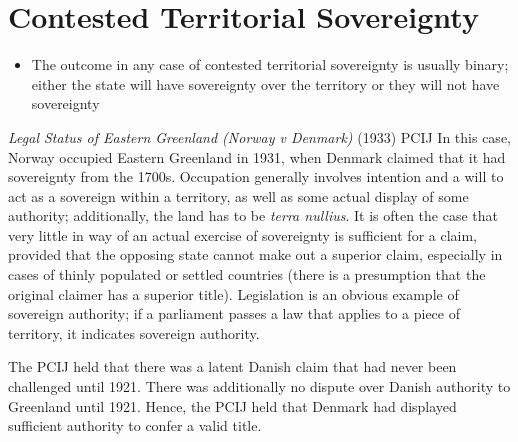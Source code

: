 \section{Contested Territorial Sovereignty}
\begin{itemize}
    \item The outcome in any case of contested territorial sovereignty is usually binary; either the state will have sovereignty over the territory or they will not have sovereignty
\end{itemize}
\begin{casedetails}{\textit{Legal Status of Eastern Greenland (Norway v Denmark)} (1933) PCIJ}
    \flushleft
    In this case, Norway occupied Eastern Greenland in 1931, when Denmark claimed that it had sovereignty from the 1700s. Occupation generally involves intention and a will to act as a sovereign within a territory, as well as some actual display of some authority; additionally, the land has to be \textit{terra nullius}. It is often the case that very little in way of an actual exercise of sovereignty is sufficient for a claim, provided that the opposing state cannot make out a superior claim, especially in cases of thinly populated or settled countries (there is a presumption that the original claimer has a superior title). Legislation is an obvious example of sovereign authority; if a parliament passes a law that applies to a piece of territory, it indicates sovereign authority.

    \vspace{\baselineskip}

    The PCIJ held that there was a latent Danish claim that had never been challenged until 1921. There was additionally no dispute over Danish authority to Greenland until 1921. Hence, the PCIJ held that Denmark had displayed sufficient authority to confer a valid title.
\end{casedetails}

